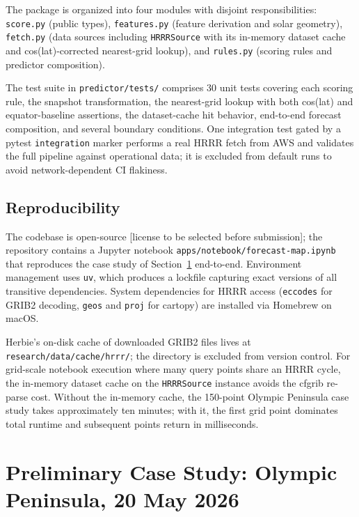 \documentclass[11pt,a4paper]{article}
\begin{document}
The package is organized into four modules with disjoint responsibilities: \texttt{score.py} (public types), \texttt{features.py} (feature derivation and solar geometry), \texttt{fetch.py} (data sources including \texttt{HRRRSource} with its in-memory dataset cache and cos(lat)-corrected nearest-grid lookup), and \texttt{rules.py} (scoring rules and predictor composition).

The test suite in \texttt{predictor/tests/} comprises 30 unit tests covering each scoring rule, the snapshot transformation, the nearest-grid lookup with both cos(lat) and equator-baseline assertions, the dataset-cache hit behavior, end-to-end forecast composition, and several boundary conditions. One integration test gated by a pytest \texttt{integration} marker performs a real HRRR fetch from AWS and validates the full pipeline against operational data; it is excluded from default runs to avoid network-dependent CI flakiness.

\subsection{Reproducibility}

The codebase is open-source [license to be selected before submission]; the repository contains a Jupyter notebook \texttt{apps/notebook/forecast-map.ipynb} that reproduces the case study of Section~\ref{sec:casestudy} end-to-end. Environment management uses \texttt{uv}, which produces a lockfile capturing exact versions of all transitive dependencies. System dependencies for HRRR access (\texttt{eccodes} for GRIB2 decoding, \texttt{geos} and \texttt{proj} for cartopy) are installed via Homebrew on macOS.

Herbie's on-disk cache of downloaded GRIB2 files lives at \texttt{research/data/cache/hrrr/}; the directory is excluded from version control. For grid-scale notebook execution where many query points share an HRRR cycle, the in-memory dataset cache on the \texttt{HRRRSource} instance avoids the cfgrib re-parse cost. Without the in-memory cache, the 150-point Olympic Peninsula case study takes approximately ten minutes; with it, the first grid point dominates total runtime and subsequent points return in milliseconds.

\section{Preliminary Case Study: Olympic Peninsula, 20 May 2026}
\label{sec:casestudy}
\end{document}
